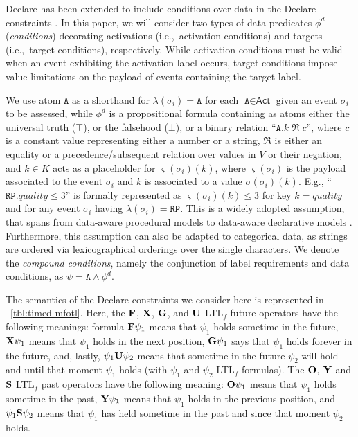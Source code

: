Declare has been extended to include conditions over data in the Declare constraints \cite{BurattinMS16}. In this paper, we will consider two types of data predicates $\phi^d$ (\textit{conditions}) decorating activations (i.e.,\ activation conditions) and targets (i.e.,\ target conditions), respectively.
While activation conditions must be valid when an event exhibiting the activation label occurs, target conditions impose value limitations on the payload of events containing the target label.


We use atom $\texttt{A}$ as a shorthand for $\lambda(\sigma_i)=\texttt{A}$ for each $\texttt{A}\in\textsf{Act}$ given an event $\sigma_i$ to be assessed, while $\phi^d$ is a propositional formula containing as atoms either the universal truth ($\top$), or the falsehood ($\bot$), or a binary relation ``$\texttt{A}.k\;\Re\;c$'', where $c$ is a constant value representing either a number or a string, $\Re$ is either an equality or a precedence/subsequent relation over values in $V$ or their negation, and $k\in K$ acts as a placeholder for $\varsigma(\sigma_i)(k)$, where $\varsigma(\sigma_i)$ is the payload associated to the event $\sigma_i$ and $k$ is associated to a value $\sigma(\sigma_i)(k)$. E.g., ``$\texttt{RP}.\textit{quality}\leq 3$'' is formally represented as $\varsigma(\sigma_i)(k)\leq 3$ for key $k=quality$ and for any event $\sigma_i$ having $\lambda(\sigma_i)=\texttt{RP}$.  This is a widely adopted assumption, that spans from data-aware procedural models \cite{MultiPerspective} to data-aware declarative models \cite{BurattinMS16}. Furthermore, this assumption can also be adapted to categorical data, as strings are ordered via lexicographical orderings over the single characters. We denote the \textit{compound conditions}, namely the conjunction of label requirements and data conditions, as $\psi=\texttt{A}\wedge \phi^d$.



The semantics of the Declare constraints we consider here is represented in \tablename~\ref{tbl:timed-mfotl}.
Here, the $\mathbf{F}$, $\mathbf{X}$, $\mathbf{G}$, and $\mathbf{U}$ LTL$_f$ future operators have the following meanings: formula $\mathbf{F} \psi_1$ means that $\psi_1$ holds sometime in the future, $\mathbf{X} \psi_1$ means that $\psi_1$
holds in the next position, $\mathbf{G} \psi_1$ says that $\psi_1$ holds forever in the future, and, lastly, $\psi_1 \mathbf{U} \psi_2$ means that sometime in the future $\psi_2$ will hold and
until that moment $\psi_1$ holds (with $\psi_1$ and $\psi_2$ LTL$_f$ formulas).
The $\mathbf{O}$, $\mathbf{Y}$ and $\mathbf{S}$ LTL$_f$ past operators have the following meaning:
$\mathbf{O} \psi_1$ means that $\psi_1$ holds sometime in the past,
$\mathbf{Y} \psi_1$ means that $\psi_1$ holds in the previous position,
and $\psi_1 \mathbf{S} \psi_2$ means that $\psi_1$ has held sometime in the past and since that moment $\psi_2$ holds.


